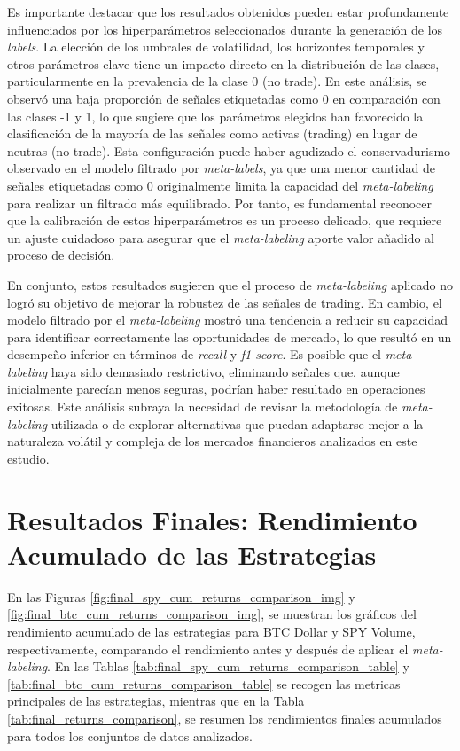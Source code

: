 \documentclass[a4paper,12pt, twoside]{report}
\begin{document}
Es importante destacar que los resultados obtenidos pueden estar profundamente influenciados por los hiperparámetros 
seleccionados durante la generación de los \textit{labels}. La elección de los umbrales de volatilidad, 
los horizontes temporales y otros parámetros clave tiene un impacto directo en la distribución de las clases, 
particularmente en la prevalencia de la clase 0 (no trade). En este análisis, se observó una baja proporción 
de señales etiquetadas como 0 en comparación con las clases -1 y 1, lo que sugiere que los parámetros 
elegidos han favorecido la clasificación de la mayoría de las señales como activas (trading) en lugar de neutras 
(no trade). Esta configuración puede haber agudizado el conservadurismo observado en el modelo filtrado por 
\textit{meta-labels}, ya que una menor cantidad de señales etiquetadas como 0 originalmente limita la capacidad 
del \textit{meta-labeling} para realizar un filtrado más equilibrado. Por tanto, es fundamental reconocer que la 
calibración de estos hiperparámetros es un proceso delicado, que requiere un ajuste cuidadoso para asegurar que 
el \textit{meta-labeling} aporte valor añadido al proceso de decisión.

En conjunto, estos resultados sugieren que el proceso de \textit{meta-labeling} aplicado no logró su objetivo de 
mejorar la robustez de las señales de trading. En cambio, el modelo filtrado por el \textit{meta-labeling} mostró 
una tendencia a reducir su capacidad para identificar correctamente las oportunidades de mercado, lo que resultó 
en un desempeño inferior en términos de \textit{recall} y \textit{f1-score}. Es posible que el \textit{meta-labeling} 
haya sido demasiado restrictivo, eliminando señales que, aunque inicialmente parecían menos seguras, podrían haber 
resultado en operaciones exitosas. Este análisis subraya la necesidad de revisar la metodología de \textit{meta-labeling} 
utilizada o de explorar alternativas que puedan adaptarse mejor a la naturaleza volátil y compleja de los mercados 
financieros analizados en este estudio.


\section{Resultados Finales: Rendimiento Acumulado de las Estrategias}


En las Figuras \ref{fig:final_spy_cum_returns_comparison_img} y \ref{fig:final_btc_cum_returns_comparison_img}, 
se muestran los gráficos del rendimiento acumulado de las estrategias para BTC Dollar y SPY Volume, respectivamente, 
comparando el rendimiento antes y después de aplicar el \textit{meta-labeling}. En las Tablas 
\ref{tab:final_spy_cum_returns_comparison_table} y \ref{tab:final_btc_cum_returns_comparison_table} se recogen 
las metricas principales de las estrategias, mientras que en la Tabla \ref{tab:final_returns_comparison}, 
se resumen los rendimientos finales acumulados para todos los conjuntos de datos analizados. 
\end{document}
